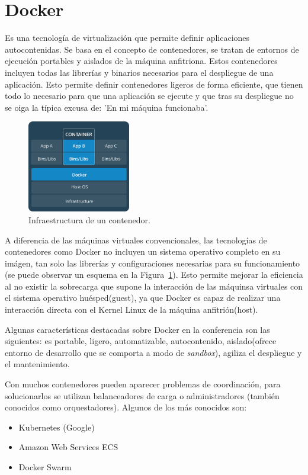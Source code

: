 \vspace{1cm}
\section{Docker }
Es una tecnología de virtualización que permite definir aplicaciones autocontenidas. Se basa en el concepto de contenedores, se tratan de entornos de ejecución portables y aislados de la máquina anfitriona. Estos contenedores incluyen todas las librerías y binarios necesarios para el despliegue de una aplicación. Esto permite definir contenedores ligeros de forma eficiente, que tienen todo lo necesario para que una aplicación se ejecute y que tras su despliegue no se oiga la típica excusa de: 'En mi máquina funcionaba'.

\begin{figure}
\centering
\includegraphics[width=0.4\textwidth]{container.png}
\caption{\label{fig:cont}Infraestructura de un contenedor.}
\end{figure}

A diferencia de las máquinas virtuales convencionales, las tecnologías de contenedores como Docker no incluyen un sistema operativo completo en su imágen, tan solo las librerías y configuraciones necesarias para su funcionamiento (se puede observar un esquema en la Figura~\ref{fig:cont}). Esto permite mejorar la eficiencia al no existir la sobrecarga que supone la interacción de las máquinsa virtuales con el sistema operativo huésped(guest), ya que Docker es capaz de realizar una interacción directa con el Kernel Linux de la máquina anfitrión(host).

Algunas características destacadas sobre Docker en la conferencia son las siguientes: es portable, ligero, automatizable, autocontenido, aislado(ofrece entorno de desarrollo que se comporta a modo de \textit{sandbox}), agiliza el despliegue y el mantenimiento.

Con muchos contenedores pueden aparecer problemas de coordinación, para solucionarlos se utilizan balanceadores de carga o administradores (también conocidos como orquestadores). Algunos de los más conocidos son:
\begin{itemize}
\item Kubernetes (Google)
\item Amazon Web Services ECS
\item Docker Swarm
\end{itemize}


